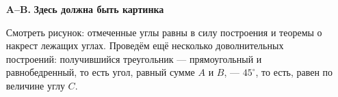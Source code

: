 \begin{itemize}

\item[\bfseries A–B.] {\bfseries Здесь должна быть картинка}


Смотреть рисунок: отмеченные углы равны в силу построения и теоремы о накрест лежащих углах. Проведём ещё несколько доволнительных построений: получившийся треугольник — прямоугольный и равнобедренный, то есть угол, равный сумме $A$ и $B$, — $45^\circ$, то есть, равен по величине углу $C$.
\end{itemize}